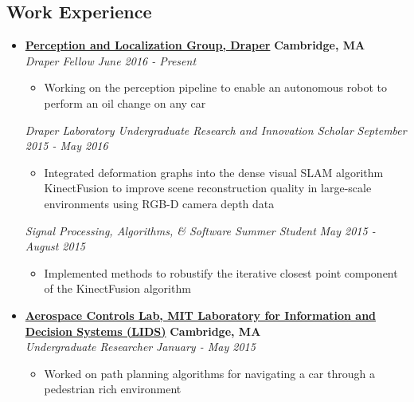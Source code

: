 \documentclass[10pt,letterpaper]{article}
\begin{document}
\subsection*{Work Experience}
  \begin{itemize}
    \parskip=-0.1em

    \item[]
    {\href{http://draper.com/}{\textbf{Perception and Localization Group, Draper}} \hfill
      \textbf{Cambridge, MA}}
    \\
        {\emph{Draper Fellow} \hfill \emph{June 2016 - Present}}
	
	\begin{itemize}[label=\textbullet]
	\itemsep0em 
	\item Working on the perception pipeline to enable an autonomous robot to perform an oil change on any car
	\end{itemize} 
    {\emph{Draper Laboratory Undergraduate Research and Innovation Scholar} \hfill \emph{September 2015 - May 2016}}
	
	\begin{itemize}[label=\textbullet]
	\itemsep0em 
	\item Integrated deformation graphs into the dense visual SLAM  algorithm KinectFusion to improve scene reconstruction quality in large-scale environments using RGB-D camera depth data
	\end{itemize} 
		{\emph{Signal Processing, Algorithms, \& Software Summer Student} \hfill \emph{May 2015 - August 2015}}
	\begin{itemize}[label=\textbullet]
	\item Implemented methods to robustify the iterative closest point component of the KinectFusion algorithm 
	
\end{itemize}

    \item[]
    {\href{http://acl.mit.edu/}{\textbf{Aerospace Controls Lab, MIT Laboratory for Information and Decision Systems (LIDS)}} \hfill
      \textbf{Cambridge, MA}}
    \\
    {\emph{Undergraduate Researcher} \hfill \emph{January - May 2015}}
	
	\begin{itemize}[label=\textbullet]
	\itemsep0em 
	\item Worked on path planning algorithms for navigating a car through a pedestrian rich environment
	

\end{itemize}
\end{itemize}
\end{document}
